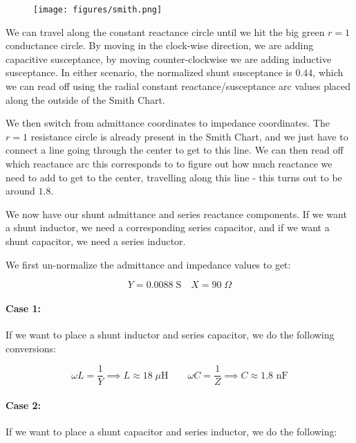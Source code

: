 \documentclass{article}
\begin{document}
\begin{figure}[ht!]
\begin{center}
    \texttt{[image: figures/smith.png]}
\end{center}
\end{figure}

We can travel along the constant reactance circle until we hit the big green $r = 1$ conductance circle. By moving in the clock-wise direction, we are adding capacitive susceptance, by moving counter-clockwise we are adding inductive susceptance. In either scenario, the normalized shunt susceptance is $0.44$, which we can read off using the radial constant reactance/susceptance arc values placed along the outside of the Smith Chart.

\newpage

We then switch from admittance coordinates to impedance coordinates. The $r = 1$ resistance circle is already present in the Smith Chart, and we just have to connect a line going through the center to get to this line. We can then read off which reactance arc this corresponds to to figure out how much reactance we need to add to get to the center, travelling along this line - this turns out to be around $1.8$. 



We now have our shunt admittance and series reactance components. If we want a shunt inductor, we need a corresponding series capacitor, and if we want a shunt capacitor, we need a series inductor. 
\vspace{3mm}

We first un-normalize the admittance and impedance values to get:

\[
Y = 0.0088 \;\text{S} \quad X = 90 \;\Omega
\]

\paragraph{Case 1:} 

If we want to place a shunt inductor and series capacitor, we do the following conversions:

\[
\omega L = \frac{1}{Y} \implies L \approx 18 \;\mu\text{H} \qquad
\omega C = \frac{1}{Z} \implies C \approx 1.8 \text{ nF}
\]

\paragraph{Case 2:}

If we want to place a shunt capacitor and series inductor, we do the following:
\end{document}
